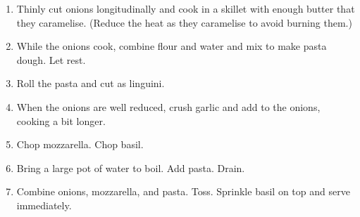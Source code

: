 
\begin{ingredients}



\end{ingredients}


\begin{recipe}
  \begin{enumerate}

  \item Thinly cut onions longitudinally and cook in a skillet with
    enough butter that they caramelise.  (Reduce the heat as they
    caramelise to avoid burning them.)

  \item While the onions cook, combine flour and water and mix to make
    pasta dough.  Let rest.

  \item Roll the pasta and cut as linguini.

  \item When the onions are well reduced, crush garlic and add to the
    onions, cooking a bit longer.

  \item Chop mozzarella.  Chop basil.

  \item Bring a large pot of water to boil.  Add pasta.  Drain.

  \item Combine onions, mozzarella, and pasta.  Toss.  Sprinkle basil
    on top and serve immediately.
    
  \end{enumerate}
\end{recipe}

